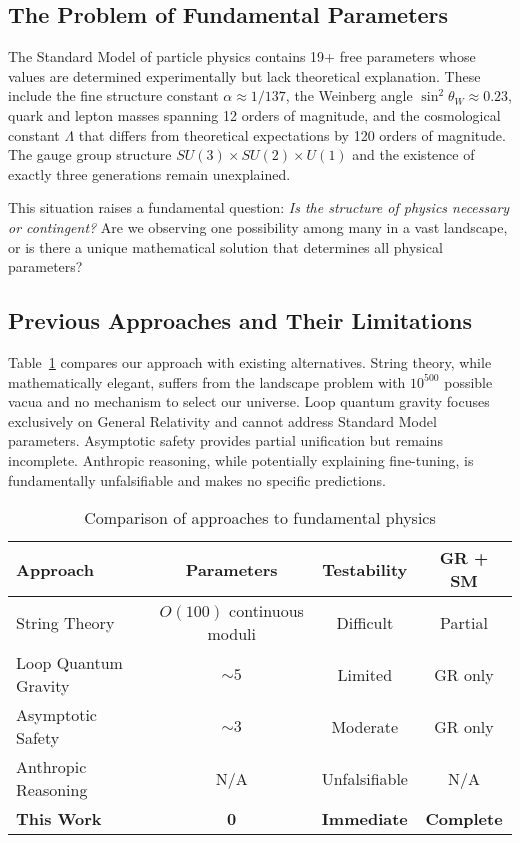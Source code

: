 \documentclass[11pt]{article}
\theoremstyle{definition}
\begin{document}
\subsection{The Problem of Fundamental Parameters}

The Standard Model of particle physics contains 19+ free parameters whose values are determined experimentally but lack theoretical explanation. These include the fine structure constant $\alpha \approx 1/137$, the Weinberg angle $\sin^2\theta_W \approx 0.23$, quark and lepton masses spanning 12 orders of magnitude, and the cosmological constant $\Lambda$ that differs from theoretical expectations by 120 orders of magnitude. The gauge group structure $SU(3) \times SU(2) \times U(1)$ and the existence of exactly three generations remain unexplained. 

This situation raises a fundamental question: \textit{Is the structure of physics necessary or contingent?} Are we observing one possibility among many in a vast landscape, or is there a unique mathematical solution that determines all physical parameters?

\subsection{Previous Approaches and Their Limitations}

Table~\ref{tab:comparison} compares our approach with existing alternatives. String theory, while mathematically elegant, suffers from the landscape problem with $10^{500}$ possible vacua and no mechanism to select our universe. Loop quantum gravity focuses exclusively on General Relativity and cannot address Standard Model parameters. Asymptotic safety provides partial unification but remains incomplete. Anthropic reasoning, while potentially explaining fine-tuning, is fundamentally unfalsifiable and makes no specific predictions.

\begin{table}[h]
\centering
\caption{Comparison of approaches to fundamental physics}
\label{tab:comparison}
\begin{tabular}{lccc}
\toprule
Approach & Parameters & Testability & GR + SM \\
\midrule
String Theory & $O(100)$ continuous moduli & Difficult & Partial \\
Loop Quantum Gravity & $\sim 5$ & Limited & GR only \\
Asymptotic Safety & $\sim 3$ & Moderate & GR only \\
Anthropic Reasoning & N/A & Unfalsifiable & N/A \\
\textbf{This Work} & \textbf{0} & \textbf{Immediate} & \textbf{Complete} \\
\bottomrule
\end{tabular}
\end{table}
\end{document}

